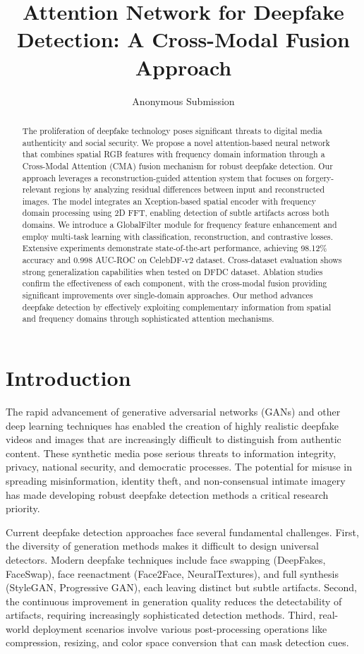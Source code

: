 \documentclass[letterpaper]{article} %
\title{Attention Network for Deepfake Detection: A Cross-Modal Fusion Approach}
\author{
Anonymous Submission
}
\begin{document}
\maketitle

\begin{abstract}
The proliferation of deepfake technology poses significant threats to digital media authenticity and social security. We propose a novel attention-based neural network that combines spatial RGB features with frequency domain information through a Cross-Modal Attention (CMA) fusion mechanism for robust deepfake detection. Our approach leverages a reconstruction-guided attention system that focuses on forgery-relevant regions by analyzing residual differences between input and reconstructed images. The model integrates an Xception-based spatial encoder with frequency domain processing using 2D FFT, enabling detection of subtle artifacts across both domains. We introduce a GlobalFilter module for frequency feature enhancement and employ multi-task learning with classification, reconstruction, and contrastive losses. Extensive experiments demonstrate state-of-the-art performance, achieving 98.12\% accuracy and 0.998 AUC-ROC on CelebDF-v2 dataset. Cross-dataset evaluation shows strong generalization capabilities when tested on DFDC dataset. Ablation studies confirm the effectiveness of each component, with the cross-modal fusion providing significant improvements over single-domain approaches. Our method advances deepfake detection by effectively exploiting complementary information from spatial and frequency domains through sophisticated attention mechanisms.
\end{abstract}

\section{Introduction}

The rapid advancement of generative adversarial networks (GANs) and other deep learning techniques has enabled the creation of highly realistic deepfake videos and images that are increasingly difficult to distinguish from authentic content. These synthetic media pose serious threats to information integrity, privacy, national security, and democratic processes. The potential for misuse in spreading misinformation, identity theft, and non-consensual intimate imagery has made developing robust deepfake detection methods a critical research priority.

Current deepfake detection approaches face several fundamental challenges. First, the diversity of generation methods makes it difficult to design universal detectors. Modern deepfake techniques include face swapping (DeepFakes, FaceSwap), face reenactment (Face2Face, NeuralTextures), and full synthesis (StyleGAN, Progressive GAN), each leaving distinct but subtle artifacts. Second, the continuous improvement in generation quality reduces the detectability of artifacts, requiring increasingly sophisticated detection methods. Third, real-world deployment scenarios involve various post-processing operations like compression, resizing, and color space conversion that can mask detection cues.
\end{document}

